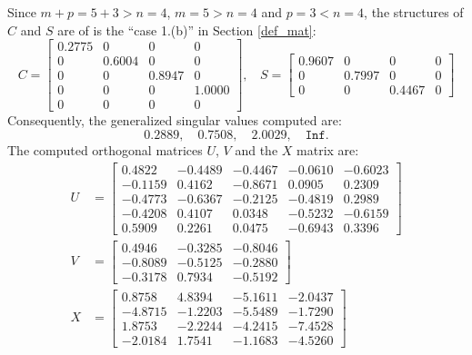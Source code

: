 \begin{example}
{\begin{enumerate}[(1).]
Since $m + p  =  5 + 3 > n = 4$, $m = 5 > n = 4$ and $p=3 < n = 4$, 
the structures of $C$ and $S$ are of is the 
``case 1.(b)'' in Section \ref{def_mat}: 
\begin{equation*}
                C = \begin{bmatrix}
                    0.2775  &       0  &       0    &     0 \\
                         0  &  0.6004  &       0    &     0 \\
                         0  &       0  &  0.8947    &     0 \\
                         0  &       0  &       0    & 1.0000 \\
                         0  &       0  &       0    &     0
                \end{bmatrix}, \ \ \ \
                S = \begin{bmatrix}
                    0.9607 &        0 &        0    &  0 \\
                         0 &   0.7997 &        0    &  0 \\
                         0 &        0 &   0.4467    &  0 
                \end{bmatrix}
            \end{equation*}
Consequently, 
the generalized singular values computed are: 
\[
0.2889, \quad
0.7508, \quad
2.0029,  \quad 
\texttt{Inf}. 
\] 
The computed orthogonal matrices $U$, $V$ and the $X$ matrix are:
\begin{align*}
                U &= \begin{bmatrix}
                    0.4822 &  -0.4489 &  -0.4467 &  -0.0610 &  -0.6023 \\
                   -0.1159 &   0.4162 &  -0.8671 &   0.0905 &   0.2309 \\
                   -0.4773 &  -0.6367 &  -0.2125 &  -0.4819 &   0.2989 \\
                   -0.4208 &   0.4107 &   0.0348 &  -0.5232 &  -0.6159 \\
                    0.5909 &   0.2261 &   0.0475 &  -0.6943 &   0.3396
                \end{bmatrix} \\
                V &= \begin{bmatrix}
                    0.4946 &  -0.3285 &  -0.8046 \\
                   -0.8089 &  -0.5125 &  -0.2880 \\
                   -0.3178 &   0.7934 &  -0.5192
                \end{bmatrix} \\
                X &= \begin{bmatrix}
                    0.8758 &  4.8394  & -5.1611 & -2.0437 \\
                   -4.8715 & -1.2203  & -5.5489 & -1.7290 \\
                    1.8753 & -2.2244  & -4.2415 & -7.4528 \\
                   -2.0184 &  1.7541  & -1.1683 & -4.5260
                \end{bmatrix}
            \end{align*}


\end{enumerate}}
\end{example}
